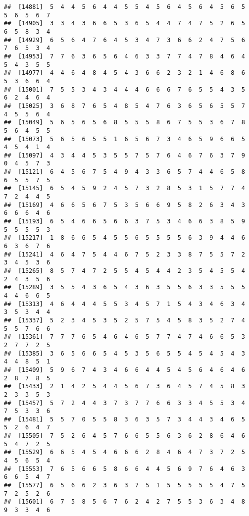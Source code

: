 \documentclass[
]{book}
\begin{document}
\begin{verbatim}
##  [14881]  5  4  4  5  6  4  4  5  5  4  5  6  4  5  6  4  5  6  5  5  6  5  6  7
##  [14905]  3  3  4  3  6  6  5  3  6  5  4  4  7  4  7  5  2  6  5  6  5  8  3  4
##  [14929]  6  5  6  4  7  6  4  5  3  4  7  3  6  6  2  4  7  5  6  7  6  5  3  4
##  [14953]  7  7  6  3  6  5  6  4  6  3  3  7  7  4  7  8  4  6  4  5  4  3  5  5
##  [14977]  4  4  6  4  8  4  5  4  3  6  6  2  3  2  1  4  6  8  6  5  3  6  6  4
##  [15001]  7  5  5  3  4  3  4  4  4  6  6  6  7  6  5  5  4  3  5  6  2  4  6  4
##  [15025]  3  6  8  7  6  5  4  8  5  4  7  6  3  6  5  6  5  5  7  4  5  5  6  4
##  [15049]  5  6  5  6  5  6  8  5  5  5  8  6  7  5  5  3  6  7  8  5  6  4  5  5
##  [15073]  5  6  5  6  5  5  1  6  5  6  7  3  4  6  5  9  6  6  5  4  5  4  1  4
##  [15097]  4  3  4  4  5  3  5  5  7  5  7  6  4  6  7  6  3  7  9  0  4  5  7  3
##  [15121]  6  4  5  6  7  5  4  9  4  3  3  6  5  7  4  4  6  5  8  6  5  5  7  5
##  [15145]  6  5  4  5  9  2  4  5  7  3  2  8  5  3  1  5  7  7  4  7  2  4  4  5
##  [15169]  4  6  6  5  6  7  5  3  5  6  6  9  5  8  2  6  3  4  3  6  6  6  4  6
##  [15193]  6  5  4  6  6  5  6  6  3  7  5  3  4  6  6  3  8  5  9  5  5  5  5  3
##  [15217]  1  8  6  6  5  4  5  5  6  5  5  5  5  6  3  9  4  4  6  6  3  6  7  6
##  [15241]  4  6  4  7  5  4  4  6  7  5  2  3  3  8  7  5  5  7  2  3  4  5  3  6
##  [15265]  8  5  7  4  7  2  5  5  4  5  4  4  2  3  5  4  5  5  4  2  4  3  5  6
##  [15289]  3  5  5  4  3  6  5  4  3  6  3  5  5  6  3  3  5  5  5  4  4  6  6  5
##  [15313]  4  6  4  4  4  5  5  3  4  5  7  1  5  4  3  4  6  3  4  3  5  3  4  4
##  [15337]  5  2  3  4  5  3  5  2  5  7  5  4  5  8  3  5  2  7  4  5  5  7  6  6
##  [15361]  7  7  7  6  5  4  6  4  6  5  7  7  4  7  4  6  6  5  3  2  7  7  2  5
##  [15385]  3  6  5  6  6  5  4  5  3  5  6  5  5  4  5  4  5  4  3  4  4  8  5  1
##  [15409]  5  9  6  7  4  3  4  6  6  4  4  5  4  5  6  4  6  4  6  2  8  7  8  5
##  [15433]  2  1  4  2  5  4  4  5  6  7  3  6  4  5  7  4  5  8  3  2  3  3  5  3
##  [15457]  5  7  2  4  4  3  7  3  7  7  6  6  3  3  4  5  5  3  4  7  5  3  3  6
##  [15481]  5  5  7  0  5  5  8  3  6  3  5  7  3  4  4  3  4  6  5  5  2  6  4  7
##  [15505]  7  5  2  6  4  5  7  6  6  5  5  6  3  6  2  8  6  4  6  5  4  7  2  5
##  [15529]  6  6  5  4  5  4  6  6  6  2  8  4  6  4  7  3  7  2  5  4  5  6  5  4
##  [15553]  7  6  5  6  6  5  8  6  6  4  4  5  6  9  7  6  4  6  3  6  6  5  4  7
##  [15577]  6  5  6  6  2  3  6  3  7  5  1  5  5  5  5  5  4  7  5  7  2  5  2  6
##  [15601]  6  7  5  8  5  6  7  6  2  4  2  7  5  5  3  6  3  4  8  9  3  3  4  6

\end{verbatim}
\end{document}
